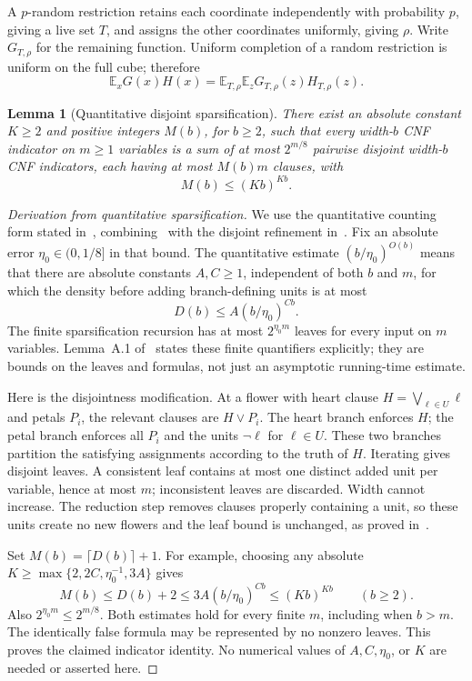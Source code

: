 \documentclass[11pt,letterpaper]{article}
\newtheorem{lemma}[theorem]{Lemma}
\theoremstyle{definition}
\numberwithin{equation}{section}
\newcommand{\E}{\mathbb E}
\begin{document}
A $p$-random restriction retains each coordinate independently with
probability $p$, giving a live set $T$, and assigns the other coordinates
uniformly, giving $\rho$. Write $G_{T,\rho}$ for the remaining function.
Uniform completion of a random restriction is uniform on the full cube;
therefore
\begin{equation}\label{eq:restriction-average}
 \E_xG(x)H(x)=\E_{T,\rho}\E_zG_{T,\rho}(z)H_{T,\rho}(z).
\end{equation}

\begin{lemma}[Quantitative disjoint sparsification]\label{lem:sparsification}
There exist an absolute constant $K\ge2$ and positive integers $M(b)$,
for $b\ge2$, such that every width-$b$ CNF indicator on $m\ge1$ variables
is a sum of at most $2^{m/8}$ pairwise disjoint width-$b$ CNF indicators,
each having at most $M(b)m$ clauses, with
\begin{equation}\label{eq:sparse}
 M(b)\le(Kb)^{Kb}.
\end{equation}
\end{lemma}
\begin{proof}[Derivation from quantitative sparsification]
We use the quantitative counting form stated in~\cite[Section~4,
p.~6:9]{Williams}, combining~\cite[Section~6]{CIP} with the disjoint
refinement in~\cite[Appendix~A, Lemma~A.1 and its following proof]{DHMTW}.
Fix an absolute error $\eta_0\in(0,1/8]$ in that bound. The quantitative
estimate $(b/\eta_0)^{O(b)}$ means that there are absolute constants
$A,C\ge1$, independent of both $b$ and $m$, for which the density before
adding branch-defining units is at most
\[
 D(b)\le A(b/\eta_0)^{Cb}.
\]
The finite sparsification recursion has at most $2^{\eta_0m}$ leaves
for every input on $m$ variables. Lemma~A.1 of~\cite{DHMTW} states these
finite quantifiers explicitly; they are bounds on the leaves and formulas,
not just an asymptotic running-time estimate.

Here is the disjointness modification. At a flower with heart clause
$H=\bigvee_{\ell\in U}\ell$ and petals $P_i$, the relevant clauses are
$H\vee P_i$. The heart branch enforces $H$; the petal branch enforces
all $P_i$ and the units $\neg\ell$ for $\ell\in U$. These two branches
partition the satisfying assignments according to the truth of $H$.
Iterating gives disjoint leaves. A consistent leaf contains at most one
distinct added unit per variable, hence at most $m$; inconsistent leaves
are discarded. Width cannot increase. The reduction step removes clauses
properly containing a unit, so these units create no new flowers and the
leaf bound is unchanged, as proved in~\cite[Appendix~A]{DHMTW}.

Set $M(b)=\lceil D(b)\rceil+1$. For example, choosing any absolute
$K\ge\max\{2,2C,\eta_0^{-1},3A\}$ gives
\[
 M(b)\le D(b)+2\le3A(b/\eta_0)^{Cb}\le(Kb)^{Kb}
 \qquad(b\ge2).
\]
Also $2^{\eta_0m}\le2^{m/8}$. Both estimates hold for every finite $m$,
including when $b>m$. The identically false formula may be represented
by no nonzero leaves. This proves the claimed indicator identity.
No numerical values of $A,C,\eta_0$, or $K$ are needed or asserted here.
\end{proof}
\end{document}
